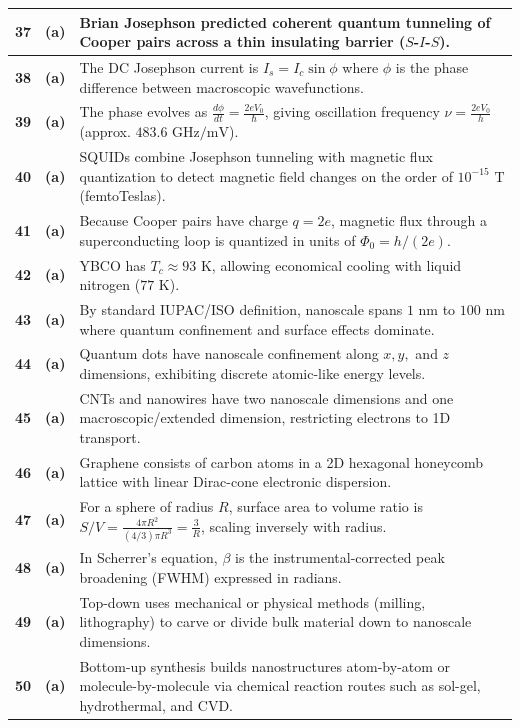 {\begin{tabularx}{\textwidth}{|c|c|X|}
\textbf{37} & \textbf{(a)} & Brian Josephson predicted coherent quantum tunneling of Cooper pairs across a thin insulating barrier ($S$-$I$-$S$). \\ \hline
\textbf{38} & \textbf{(a)} & The DC Josephson current is $I_s = I_c \sin \phi$ where $\phi$ is the phase difference between macroscopic wavefunctions. \\ \hline
\textbf{39} & \textbf{(a)} & The phase evolves as $\frac{d\phi}{dt} = \frac{2eV_0}{\hbar}$, giving oscillation frequency $\nu = \frac{2eV_0}{h}$ (approx. $483.6\text{ GHz/mV}$). \\ \hline
\textbf{40} & \textbf{(a)} & SQUIDs combine Josephson tunneling with magnetic flux quantization to detect magnetic field changes on the order of $10^{-15}\text{ T}$ (femtoTeslas). \\ \hline
\textbf{41} & \textbf{(a)} & Because Cooper pairs have charge $q = 2e$, magnetic flux through a superconducting loop is quantized in units of $\Phi_0 = h/(2e)$. \\ \hline
\textbf{42} & \textbf{(a)} & YBCO has $T_c \approx 93\text{ K}$, allowing economical cooling with liquid nitrogen ($77\text{ K}$). \\ \hline
\textbf{43} & \textbf{(a)} & By standard IUPAC/ISO definition, nanoscale spans $1\text{ nm}$ to $100\text{ nm}$ where quantum confinement and surface effects dominate. \\ \hline
\textbf{44} & \textbf{(a)} & Quantum dots have nanoscale confinement along $x, y,$ and $z$ dimensions, exhibiting discrete atomic-like energy levels. \\ \hline
\textbf{45} & \textbf{(a)} & CNTs and nanowires have two nanoscale dimensions and one macroscopic/extended dimension, restricting electrons to 1D transport. \\ \hline
\textbf{46} & \textbf{(a)} & Graphene consists of carbon atoms in a 2D hexagonal honeycomb lattice with linear Dirac-cone electronic dispersion. \\ \hline
\textbf{47} & \textbf{(a)} & For a sphere of radius $R$, surface area to volume ratio is $S/V = \frac{4\pi R^2}{(4/3)\pi R^3} = \frac{3}{R}$, scaling inversely with radius. \\ \hline
\textbf{48} & \textbf{(a)} & In Scherrer's equation, $\beta$ is the instrumental-corrected peak broadening (FWHM) expressed in radians. \\ \hline
\textbf{49} & \textbf{(a)} & Top-down uses mechanical or physical methods (milling, lithography) to carve or divide bulk material down to nanoscale dimensions. \\ \hline
\textbf{50} & \textbf{(a)} & Bottom-up synthesis builds nanostructures atom-by-atom or molecule-by-molecule via chemical reaction routes such as sol-gel, hydrothermal, and CVD. \\ \hline
\end{tabularx}
}

